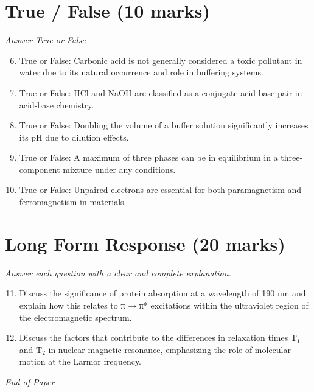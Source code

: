 \documentclass[12pt]{article}
\begin{document}
\section*{True / False (10 marks)}
\textit{Answer True or False}
\begin{enumerate}[label=\arabic*.]
\setcounter{enumi}{5}
\item True or False: Carbonic acid is not generally considered a toxic pollutant in water due to its natural occurrence and role in buffering systems.
\item True or False: HCl and NaOH are classified as a conjugate acid-base pair in acid-base chemistry.
\item True or False: Doubling the volume of a buffer solution significantly increases its pH due to dilution effects.
\item True or False: A maximum of three phases can be in equilibrium in a three-component mixture under any conditions.
\item True or False: Unpaired electrons are essential for both paramagnetism and ferromagnetism in materials.
\end{enumerate}

\section*{Long Form Response (20 marks)}
\textit{Answer each question with a clear and complete explanation.}
\begin{enumerate}[label=\arabic*.]
\setcounter{enumi}{10}
\item Discuss the significance of protein absorption at a wavelength of 190 nm and explain how this relates to π → π* excitations within the ultraviolet region of the electromagnetic spectrum.
\item Discuss the factors that contribute to the differences in relaxation times T$_{1}$ and T$_{2}$ in nuclear magnetic resonance, emphasizing the role of molecular motion at the Larmor frequency.
\end{enumerate}

\vfill
\noindent\textit{End of Paper}
\end{document}
